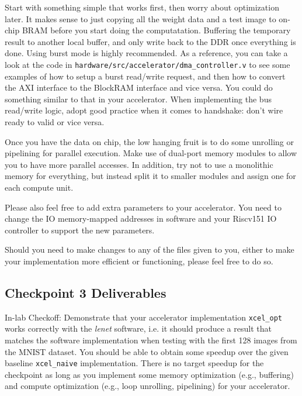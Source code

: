 \documentclass[11pt]{article}
\begin{document}
Start with something simple that works first, then worry about optimization later. It makes sense to just copying all the weight data and a test image to on-chip BRAM before you start doing the computatation. Buffering the temporary result to another local buffer, and only write back to the DDR once everything is done. Using burst mode is highly recommended. As a reference, you can take a look at the code in \verb|hardware/src/accelerator/dma_controller.v| to see some examples of how to setup a burst read/write request, and then how to convert the AXI interface to the BlockRAM interface and vice versa. You could do something similar to that in your accelerator. When implementing the bus read/write logic, adopt good practice when it comes to handshake: don't wire ready to valid or vice versa.

Once you have the data on chip, the low hanging fruit is to do some unrolling or pipelining for parallel execution. Make use of dual-port memory modules to allow you to have more parallel accesses. In addition, try not to use a monolithic memory for everything, but instead split it to smaller modules and assign one for each compute unit.

Please also feel free to add extra parameters to your accelerator. You need to change the IO memory-mapped addresses in software and your Riscv151 IO controller to support the new parameters.

Should you need to make changes to any of the files given to you, either to make your implementation more efficient or functioning, please feel free to do so.

\subsection{Checkpoint 3 Deliverables}

In-lab Checkoff: Demonstrate that your accelerator implementation \verb|xcel_opt| works correctly with the \textit{lenet} software, i.e. it should produce a result that matches the software implementation when testing with the first 128 images from the MNIST dataset. You should be able to obtain some speedup over the given baseline \verb|xcel_naive| implementation. There is no target speedup for the checkpoint as long as you implement some memory optimization (e.g., buffering) and compute optimization (e.g., loop unrolling, pipelining) for your accelerator.
\end{document}
